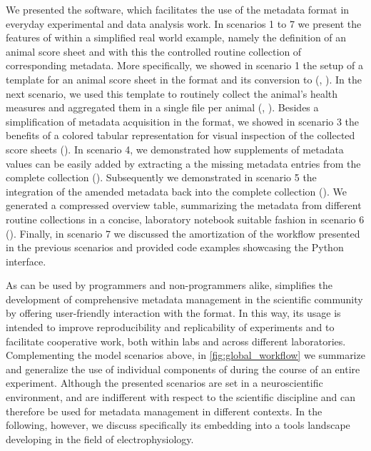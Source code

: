 We presented the  software, which facilitates the use of the  metadata format in everyday experimental and data analysis work. In scenarios 1 to 7 we present the features of  within a simplified real world example, namely the definition of an animal score sheet and with this the controlled routine collection of corresponding metadata. More specifically, we showed in scenario 1 the setup of a template for an animal score sheet in the  format and its conversion to  (\fconvert, \fgenerate). In the next scenario, we used this template to routinely collect the animal's health measures and aggregated them in a single  file per animal (\fconvert, \fmerge). Besides a simplification of metadata acquisition in the  format,  we showed in scenario 3 the benefits of a colored tabular representation for visual inspection of the collected score sheets (\fconvert). In scenario 4, we demonstrated how supplements of metadata values can be easily added by extracting a the missing metadata entries from the complete collection (\ffilter). Subsequently we demonstrated in scenario 5 the integration of the amended metadata back into the complete collection (\fmerge). We generated a compressed overview table, summarizing the metadata from different routine collections in a concise, laboratory notebook suitable fashion in scenario 6 (\fcompare). Finally, in scenario 7 we discussed the amortization of the workflow presented in the previous scenarios and provided code examples showcasing the  Python interface.

As  can be used by programmers and non-programmers alike,  simplifies the development of comprehensive metadata management in the scientific community by offering user-friendly interaction with the  format. In this way, its usage is intended to improve reproducibility and replicability of experiments and to facilitate cooperative work, both within labs and across different laboratories. Complementing the model scenarios above, in \cref{fig:global_workflow} we summarize and generalize the use of individual components of  during the course of an entire experiment. Although the presented scenarios are set in a neuroscientific environment,  and  are indifferent with respect to the scientific discipline and can therefore be used for metadata management in different contexts. In the following, however, we discuss specifically its embedding into a tools landscape developing in the field of electrophysiology.

